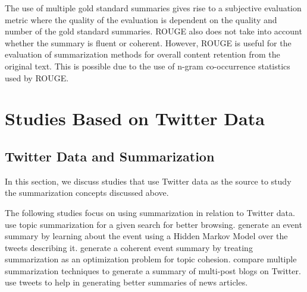 The use of multiple gold standard summaries gives rise to a subjective evaluation metric where the quality of the evaluation is dependent on the quality and number of the gold standard summaries. ROUGE also does not take into account whether the summary is fluent or coherent. However, ROUGE is useful for the evaluation of summarization methods for overall content retention from the original text. This is possible due to the use of n-gram co-occurrence statistics used by ROUGE.

\section{Studies Based on Twitter Data}

\subsection{Twitter Data and Summarization}

In this section, we discuss studies that use Twitter data as the source to study the summarization concepts discussed above.

The following studies focus on using summarization in relation to Twitter data. \cite{o2010tweetmotif} use topic summarization for a given search for better browsing. \cite{chakrabarti2011event} generate an event summary by learning about the event using a Hidden Markov Model over the tweets describing it. \cite{wang2014socially} generate a coherent event summary by treating summarization as an optimization problem for topic cohesion. \cite{inouye2011comparing} compare multiple summarization techniques to generate a summary of multi-post blogs on Twitter. \cite{wei2014utilizing} use tweets to help in generating better summaries of news articles.

